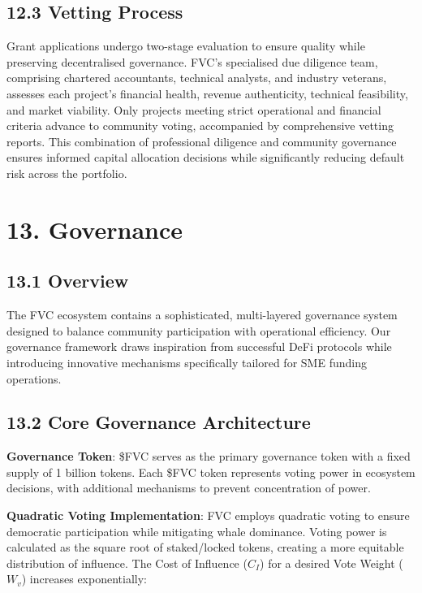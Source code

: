 \documentclass[
  paper=a4,
  ,captions=tableheading
]{scrartcl}
\begin{document}
\subsection{12.3 Vetting Process}\label{vetting-process}

Grant applications undergo two-stage evaluation to ensure quality while
preserving decentralised governance. FVC's specialised due diligence
team, comprising chartered accountants, technical analysts, and
industry veterans, assesses each project's financial health, revenue
authenticity, technical feasibility, and market viability. Only projects
meeting strict operational and financial criteria advance to community
voting, accompanied by comprehensive vetting reports. This combination
of professional diligence and community governance ensures informed
capital allocation decisions while significantly reducing default risk
across the portfolio.

\section{13. Governance}\label{governance-section}

\subsection{13.1 Overview}\label{overview}

The FVC ecosystem contains a sophisticated, multi-layered governance
system designed to balance community participation with operational
efficiency. Our governance framework draws inspiration from successful
DeFi protocols while introducing innovative mechanisms specifically
tailored for SME funding operations.

\subsection{13.2 Core Governance
Architecture}\label{core-governance-architecture}

\textbf{Governance Token}: \$FVC serves as the primary governance token
with a fixed supply of 1 billion tokens. Each \$FVC token represents
voting power in ecosystem decisions, with additional mechanisms to
prevent concentration of power.

\textbf{Quadratic Voting Implementation}: FVC employs quadratic
voting to ensure democratic participation while mitigating whale
dominance. Voting power is calculated as the square root of
staked/locked tokens, creating a more equitable distribution of
influence. The Cost of Influence ($C_I$) for a desired Vote Weight ($W_v$) increases exponentially:
\end{document}
